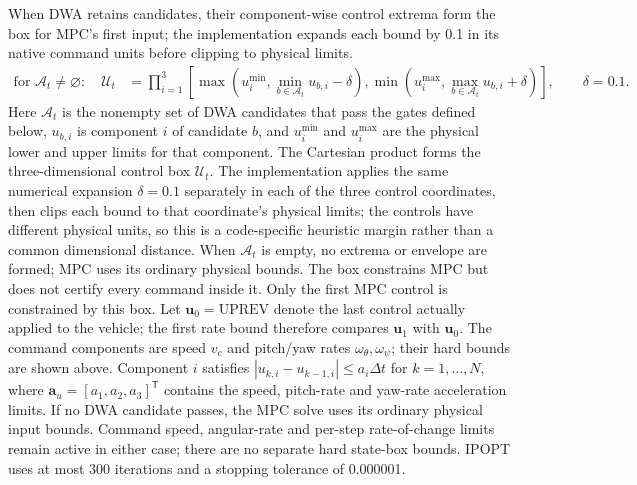 \documentclass[10pt]{article}
\begin{document}
When DWA retains candidates, their component-wise control extrema form the box for MPC's first input; the implementation expands each bound by 0.1 in its native command units before clipping to physical limits.
\begin{equation}
\begin{aligned}
\text{for }\mathcal A_t\ne\varnothing:\quad
\mathcal U_t&=\prod_{i=1}^{3}\left[
\max\!\left(u_i^{\min},\min_{b\in\mathcal A_{\scriptstyle t}}u_{b,i}-\delta\right),
\min\!\left(u_i^{\max},\max_{b\in\mathcal A_{\scriptstyle t}}u_{b,i}+\delta\right)\right],\qquad
\delta=0.1.
\end{aligned}
\end{equation}
Here $\mathcal A_t$ is the nonempty set of DWA candidates that pass the gates defined below, $u_{b,i}$ is component $i$ of candidate $b$, and $u_i^{\min}$ and $u_i^{\max}$ are the physical lower and upper limits for that component. The Cartesian product forms the three-dimensional control box $\mathcal U_t$. The implementation applies the same numerical expansion $\delta=0.1$ separately in each of the three control coordinates, then clips each bound to that coordinate's physical limits; the controls have different physical units, so this is a code-specific heuristic margin rather than a common dimensional distance. When $\mathcal A_t$ is empty, no extrema or envelope are formed; MPC uses its ordinary physical bounds. The box constrains MPC but does not certify every command inside it.
Only the first MPC control is constrained by this box. Let $\mathbf u_0=\mathrm{UPREV}$ denote the last control actually applied to the vehicle; the first rate bound therefore compares $\mathbf u_1$ with $\mathbf u_0$. The command components are speed $v_c$ and pitch/yaw rates $\omega_\theta,\omega_\psi$; their hard bounds are shown above. Component $i$ satisfies $|u_{k,i}-u_{k-1,i}|\leq a_i\Delta t$ for $k=1,\ldots,N$, where $\mathbf a_u=[a_1,a_2,a_3]^{\mathsf T}$ contains the speed, pitch-rate and yaw-rate acceleration limits. If no DWA candidate passes, the MPC solve uses its ordinary physical input bounds. Command speed, angular-rate and per-step rate-of-change limits remain active in either case; there are no separate hard state-box bounds. IPOPT uses at most 300 iterations and a stopping tolerance of 0.000001.
\end{document}
